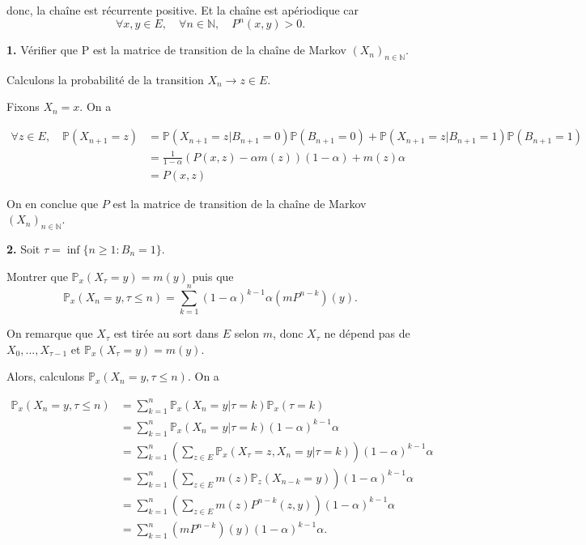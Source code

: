 \documentclass[french]{article}
\begin{document}
	donc, la chaîne est récurrente positive. Et la chaîne est apériodique car $$\forall x,y \in E, \quad \forall n \in \mathbb{N}, \quad P^n(x, y)>0.$$
	
	\begin{tcolorbox}[colback=gray!5!white,colframe=gray!75!black]
		\textbf{1.} Vérifier que P est la matrice de transition de la chaîne de Markov $(X_n)_{n \in \mathbb{N}}$.
	\end{tcolorbox}

	Calculons la probabilité de la transition $X_n \to z \in E$.
	
	Fixons $X_n = x$. On a 

	\begin{align*}
		\forall z \in E, \quad \mathbb{P}(X_{n+1} = z) &= \mathbb{P}(X_{n+1} = z| B_{n+1} = 0)\mathbb{P}(B_{n+1} = 0) + \mathbb{P}(X_{n+1} = z| B_{n+1} = 1)\mathbb{P}(B_{n+1} = 1)\\
		&= \frac{1}{1-\alpha}\left(P(x, z) - \alpha m(z)\right) (1 - \alpha) + m(z)\alpha\\
		&= P(x, z)
	\end{align*}
	
	On en conclue que $P$ est la matrice de transition de la chaîne de Markov $(X_n)_{n \in \mathbb{N}}$.
	
	
	\begin{tcolorbox}[colback=gray!5!white,colframe=gray!75!black]
		\textbf{2.} Soit $\tau = \inf \{n \geq 1 : B_n = 1\}.$
		
		Montrer que $\mathbb{P}_x(X_\tau = y) = m(y)$ puis que
		$$ \mathbb{P}_x(X_n = y, \tau \leq n) = \sum_{k=1}^{n} (1 - \alpha)^{k-1} \alpha(mP^{n-k})(y).$$
	\end{tcolorbox}

	On remarque que $X_\tau$ est tirée au sort dans $E$ selon $m$, donc $X_\tau$ ne dépend pas de $X_0,...,X_{\tau - 1}$ et $\mathbb{P}_x(X_\tau = y) = m(y)$.
	
	Alors, calculons $\mathbb{P}_x(X_n = y, \tau \leq n)$. On a
	
	\begin{align}
		\mathbb{P}_x(X_n = y, \tau \leq n) &= \sum_{k=1}^{n} \mathbb{P}_x(X_n = y | \tau = k) \mathbb{P}_x(\tau = k)\\
		&= \sum_{k=1}^{n} \mathbb{P}_x(X_n = y | \tau = k)(1 - \alpha)^{k-1} \alpha \\
		&= \sum_{k=1}^{n} \left( \sum_{z \in E} \mathbb{P}_x(X_\tau = z, X_n = y | \tau = k)\right)(1 - \alpha)^{k-1} \alpha \\
		&= \sum_{k=1}^{n} \left( \sum_{z \in E} m(z)\mathbb{P}_{z}(X_{n-k} = y)\right)(1 - \alpha)^{k-1} \alpha \\
		&= \sum_{k=1}^{n} \left( \sum_{z \in E} m(z)P^{n-k}(z, y)\right)(1 - \alpha)^{k-1} \alpha \\
		& = \sum_{k=1}^{n} (mP^{n-k})(y)(1 - \alpha)^{k-1} \alpha.
	\end{align}
\end{document}
